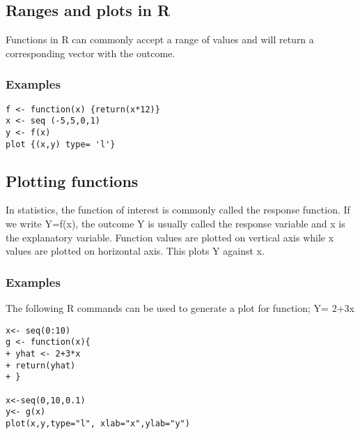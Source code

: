 \documentclass[12pt,a4paper]{article}
\theoremstyle{regla}
\theoremstyle{remark}
\theoremstyle{definition}
\theoremstyle{nonumberbreak}
\begin{document}
\subsection{Ranges and plots in R}
\begin{fbox}
\begin{minipage}{0.97\textwidth}
Functions in R can commonly accept a range of values and will return a corresponding vector with the outcome.


\end{minipage}
\end{fbox}
\subsubsection{Examples}
\begin{xmpl}
\begin{lstlisting}
f <- function(x) {return(x*12)}
x <- seq (-5,5,0,1)
y <- f(x)
plot {(x,y) type= 'l'} 
\end{lstlisting}
\end{xmpl}

\subsection{Plotting functions}
\begin{fbox}
\begin{minipage}{0.58\textwidth}
In statistics, the function of interest is commonly called the response function.
If we write Y=f(x),
the outcome Y is usually called the response variable and x is the explanatory variable.  Function values are plotted on vertical axis while x values are plotted on horizontal axis. This plots Y against x.

\end{minipage}
\hspace{0.5mm}
\begin{minipage}{0.38\textwidth}


\end{minipage}
\end{fbox}
\subsubsection{Examples}
\begin{xmpl}
The following R commands can be used to generate a plot for function; Y= 2+3x

\begin{lstlisting}
x<- seq(0:10)
g <- function(x){
+ yhat <- 2+3*x
+ return(yhat)
+ }
 
x<-seq(0,10,0.1)
y<- g(x)
plot(x,y,type="l", xlab="x",ylab="y")
\end{lstlisting}
\end{xmpl}
\end{document}
